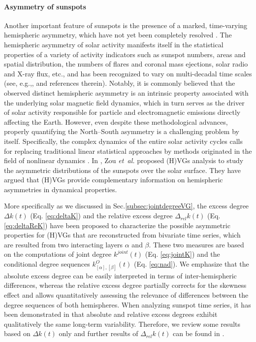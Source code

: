 		\paragraph{Asymmetry of sunspots} \label{subsec:sunspotsAsym}
		Another important feature of sunspots is the presence of a marked, time-varying hemispheric asymmetry, which have not yet been completely resolved \cite{Newton1955,zolotova2009,donner2007}. The hemispheric asymmetry of solar activity manifests itself in the statistical properties of a variety of activity indicators such as sunspot numbers, areas and spatial distribution, the numbers of flares and coronal mass ejections, solar radio and X-ray flux, etc., and has been recognized to vary on multi-decadal time scales (see, e.g.,\cite{Newton1955,Carbonell1993,zolotova2006,donner2007,donner2008a,Li2008MNRAS,li2008a,zolotova2009}, and references therein). Notably, it is commonly believed that the observed distinct hemispheric asymmetry is an intrinsic property associated with the underlying solar magnetic field dynamics, which in turn serves as the driver of solar activity responsible for particle and electromagnetic emissions directly affecting the Earth. However, even despite these methodological advances, properly quantifying the North--South asymmetry is a challenging problem by itself. Specifically, the complex dynamics of the entire solar activity cycles calls for replacing traditional linear statistical approaches by methods originated in the field of nonlinear dynamics \cite{zolotova2006,donner2007}. In \cite{Zou2014}, Zou {\textit{et~al.}} proposed (H)VGs analysis to study the asymmetric distributions of the sunspots over the solar surface. They have argued that (H)VGs provide complementary information on hemispheric asymmetries in dynamical properties.

		More specifically as we discussed in Sec.\ref{subsec:jointdegreeVG}, the excess degree $\Delta k(t)$ (Eq. \eqref{eq:deltaK}) and the relative excess degree $\Delta_{rel} k(t)$ (Eq. \eqref{eq:deltaReK}) have been proposed to characterize the possible asymmetric properties for (H)VGs that are reconstructed from bivariate time series, which are resulted from two interacting layers $\alpha$ and $\beta$. These two measures are based on the computations of joint degree $k^{joint}(t)$ (Eq. \ref{eq:jointK}) and the conditional degree sequences $k_{{[\alpha]}, {[\beta]}}^{O}(t)$ (Eq. \ref{eq:nad}). We emphasize that the absolute excess degree can be easily interpreted in terms of inter-hemispheric differences, whereas the relative excess degree partially corrects for the skewness effect and allows quantitatively assessing the relevance of differences between the degree sequences of both hemispheres. When analyzing sunspot time series, it has been demonstrated in \cite{Zou2014} that absolute and relative excess degrees exhibit qualitatively the same long-term variability. Therefore, we review some results based on $\Delta k(t)$ only and further results of $\Delta_{rel} k(t)$ can be found in \cite{Zou2014}.

